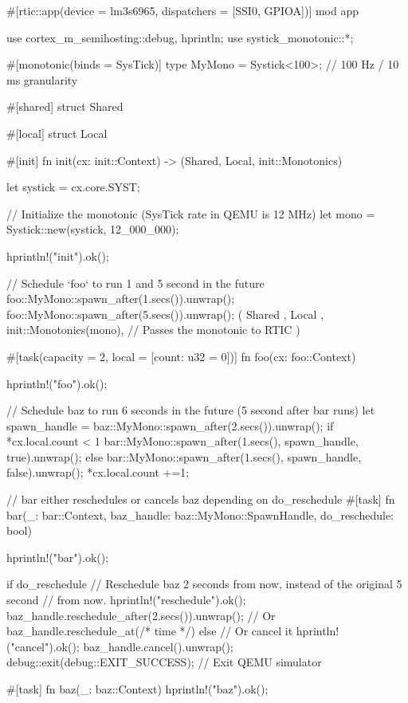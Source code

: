 #[rtic::app(device = lm3s6965, dispatchers = [SSI0, GPIOA])]
mod app {
    use cortex_m_semihosting::{debug, hprintln};
    use systick_monotonic::*;

    #[monotonic(binds = SysTick)]
    type MyMono = Systick<100>; // 100 Hz / 10 ms granularity

    #[shared]
    struct Shared {}

    #[local]
    struct Local {}

    #[init]
    fn init(cx: init::Context) -> (Shared, Local, init::Monotonics) {
        let systick = cx.core.SYST;

        // Initialize the monotonic (SysTick rate in QEMU is 12 MHz)
        let mono = Systick::new(systick, 12_000_000);

        hprintln!("init").ok();

        // Schedule `foo` to run 1 and 5 second in the future
        foo::MyMono::spawn_after(1.secs()).unwrap();
        foo::MyMono::spawn_after(5.secs()).unwrap();
        (
            Shared {},
            Local {},
            init::Monotonics(mono), // Passes the monotonic to RTIC
        )
    }

    #[task(capacity = 2, local = [count: u32 = 0])]
    fn foo(cx: foo::Context) {
        hprintln!("foo").ok();

        // Schedule baz to run 6 seconds in the future (5 second after bar runs)
        let spawn_handle = baz::MyMono::spawn_after(2.secs()).unwrap();
        if *cx.local.count < 1{
            bar::MyMono::spawn_after(1.secs(), spawn_handle, true).unwrap();
        } else {
            bar::MyMono::spawn_after(1.secs(), spawn_handle, false).unwrap();
        }
        *cx.local.count +=1;
    }

    // bar either reschedules or cancels baz depending on do_reschedule
    #[task]
    fn bar(_: bar::Context, baz_handle: baz::MyMono::SpawnHandle, do_reschedule: bool) {
        hprintln!("bar").ok();

        if do_reschedule {
            // Reschedule baz 2 seconds from now, instead of the original 5 second
            // from now.
            hprintln!("reschedule").ok();
            baz_handle.reschedule_after(2.secs()).unwrap();
            // Or baz_handle.reschedule_at(/* time */)
        } else {
            // Or cancel it
            hprintln!("cancel").ok();
            baz_handle.cancel().unwrap();
            debug::exit(debug::EXIT_SUCCESS); // Exit QEMU simulator
        }
    }

    #[task]
    fn baz(_: baz::Context) {
        hprintln!("baz").ok();
    }

}
